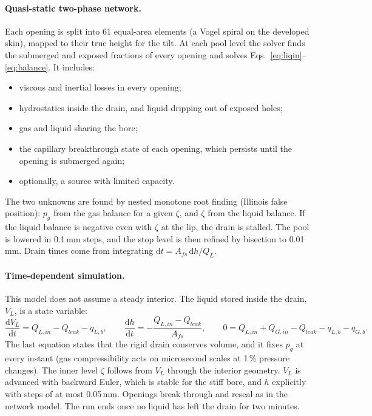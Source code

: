 \documentclass[10pt,a4paper]{article}
\newcommand{\dd}{\mathrm{d}}
\begin{document}
\paragraph{Quasi-static two-phase network.} Each opening is split into 61 equal-area elements (a Vogel spiral on the developed skin), mapped to their true height for the tilt. At each pool level the solver finds the submerged and exposed fractions of every opening and solves Eqs.~\eqref{eq:liqin}--\eqref{eq:balance}. It includes:
\begin{itemize}
\item viscous and inertial losses in every opening;
\item hydrostatics inside the drain, and liquid dripping out of exposed holes;
\item gas and liquid sharing the bore;
\item the capillary breakthrough state of each opening, which persists until the opening is submerged again;
\item optionally, a source with limited capacity.
\end{itemize}
The two unknowns are found by nested monotone root finding (Illinois false position): $p_g$ from the gas balance for a given $\zeta$, and $\zeta$ from the liquid balance. If the liquid balance is negative even with $\zeta$ at the lip, the drain is stalled. The pool is lowered in 0.1\,mm steps, and the stop level is then refined by bisection to 0.01\,mm. Drain times come from integrating $\dd t=A_{fs}\,\dd h/Q_L$.

\paragraph{Time-dependent simulation.} This model does not assume a steady interior. The liquid stored inside the drain, $V_L$, is a state variable:
\begin{equation}
\frac{\dd V_L}{\dd t}=Q_{L,in}-Q_{leak}-q_{L,b},\qquad
\frac{\dd h}{\dd t}=-\frac{Q_{L,in}-Q_{leak}}{A_{fs}},\qquad
0=Q_{L,in}+Q_{G,in}-Q_{leak}-q_{L,b}-q_{G,b}.
\end{equation}
The last equation states that the rigid drain conserves volume, and it fixes $p_g$ at every instant (gas compressibility acts on microsecond scales at 1\,\% pressure changes). The inner level $\zeta$ follows from $V_L$ through the interior geometry. $V_L$ is advanced with backward Euler, which is stable for the stiff bore, and $h$ explicitly with steps of at most 0.05\,mm. Openings break through and reseal as in the network model. The run ends once no liquid has left the drain for two minutes.
\end{document}

